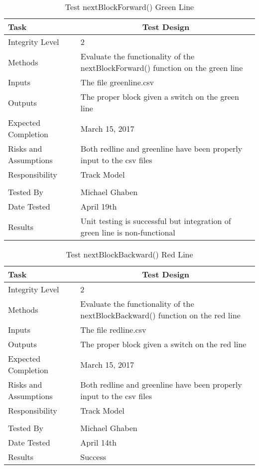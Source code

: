 \documentclass[]{article}
\begin{document}
\begin{table}[H]
	\centering
	\caption{Test nextBlockForward() Green Line}
	\begin{tabular}{|l|l|}
		\hline
		Task & \multicolumn{1}{c|}{Test Design} \\ \hline
		Integrity Level & 2 \\ \hline
		Methods & Evaluate the functionality of the nextBlockForward() function on the green line \\ \hline
		Inputs &  The file greenline.csv \\ \hline
		Outputs &  The proper block given a switch on the green line\\ \hline
		Expected Completion & March 15, 2017\\ \hline
		Risks and Assumptions & Both redline and greenline have been properly input to the csv files \\ \hline
		Responsibility & Track Model\\ \hline
		\\ \hline
		Tested By   &  Michael Ghaben\\	\hline
		Date Tested & \parbox[t]{10cm}{April 19th}\\ \hline
		Results & \parbox[t]{10cm}{Unit testing is successful but integration of green line is non-functional}\\ \hline
	\end{tabular}
\end{table}

\begin{table}[H]
	\centering
	\caption{Test nextBlockBackward() Red Line}
	\begin{tabular}{|l|l|}
		\hline
		Task & \multicolumn{1}{c|}{Test Design} \\ \hline
		Integrity Level & 2 \\ \hline
		Methods & \parbox[t]{10cm}{Evaluate the functionality of the nextBlockBackward() function on the red line} \\ \hline
		Inputs &  The file redline.csv \\ \hline
		Outputs &  The proper block given a switch on the red line\\ \hline
		Expected Completion & March 15, 2017\\ \hline
		Risks and Assumptions & Both redline and greenline have been properly input to the csv files \\ \hline
		Responsibility & Track Model\\ \hline
		\\ \hline
		Tested By   &  Michael Ghaben\\	\hline
		Date Tested & \parbox[t]{10cm}{April 14th}\\ \hline
		Results & Success\\ \hline
	\end{tabular}
\end{table}
\end{document}
